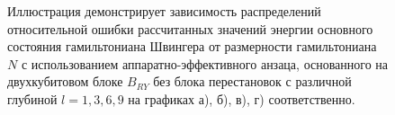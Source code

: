 \documentclass[14pt]{extarticle}
\begin{document}
\begin{figure}[H]
\begin{minipage}[H]{0.48\linewidth}
\end{minipage}
\vfill
\begin{minipage}[H]{0.48\linewidth}
\end{minipage}
\hfill
\begin{minipage}[H]{0.48\linewidth}
\end{minipage}
\caption{Иллюстрация демонстрирует зависимость распределений относительной ошибки рассчитанных значений энергии основного состояния гамильтониана Швингера от размерности гамильтониана $N$ с использованием аппаратно-эффективного анзаца, основанного на двухкубитовом блоке $B_{RY}$ без блока перестановок с различной глубиной $l = 1, 3, 6, 9$ на графиках а), б), в), г) соответственно.}\label{fig:fidelity_dims}
\end{figure}
\end{document}

